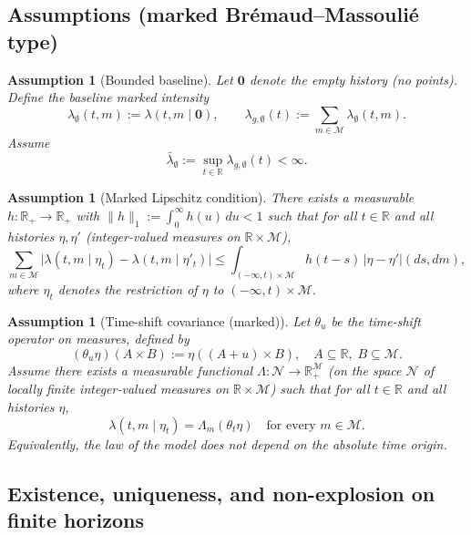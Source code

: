 \documentclass[12pt]{article}
\newtheorem{assumption}[theorem]{Assumption}
\begin{document}
\subsection{Assumptions (marked Br\'emaud--Massouli\'e type)}

\begin{assumption}[Bounded baseline]
\label{ass:H0_marked}
Let $\mathbf 0$ denote the empty history (no points).
Define the baseline marked intensity
\[
\lambda_\emptyset(t,m) := \lambda(t,m\mid \mathbf 0),
\qquad
\lambda_{g,\emptyset}(t) := \sum_{m\in\mathcal M}\lambda_\emptyset(t,m).
\]
Assume
\[
\bar\lambda_\emptyset := \sup_{t\in\mathbb R}\lambda_{g,\emptyset}(t) < \infty.
\]
\end{assumption}

\begin{assumption}[Marked Lipschitz condition]
\label{ass:HL_lambda_marked}
There exists a measurable $h:\mathbb R_+\to\mathbb R_+$ with $\|h\|_1:=\int_0^\infty h(u)\,du<1$ such that for all $t\in\mathbb R$ and all histories
$\eta,\eta'$ (integer-valued measures on $\mathbb R\times\mathcal M$),
\begin{equation}
\label{eq:HL_lambda_marked}
\sum_{m\in\mathcal M}\bigl|\lambda(t,m\mid \eta_t)-\lambda(t,m\mid \eta'_t)\bigr|
\le
\int_{(-\infty,t)\times\mathcal M} h(t-s)\,|\eta-\eta'|(ds,dm),
\end{equation}
where $\eta_t$ denotes the restriction of $\eta$ to $(-\infty,t)\times\mathcal M$.
\end{assumption}

\begin{assumption}[Time-shift covariance (marked)]
\label{ass:shift_covariance_marked}
Let $\theta_u$ be the time-shift operator on measures, defined by
\[
(\theta_u\eta)(A\times B) := \eta((A+u)\times B),
\quad A\subseteq\mathbb R,\; B\subseteq\mathcal M.
\]
Assume there exists a measurable functional $\Lambda:\mathcal N\to \mathbb R_+^{\mathcal M}$
(on the space $\mathcal N$ of locally finite integer-valued measures on $\mathbb R\times\mathcal M$)
such that for all $t\in\mathbb R$ and all histories $\eta$,
\[
\lambda(t,m\mid \eta_t)=\Lambda_m(\theta_t\eta)
\quad\text{for every }m\in\mathcal M.
\]
Equivalently, the law of the model does not depend on the absolute time origin.
\end{assumption}

\subsection{Existence, uniqueness, and non-explosion on finite horizons}
\end{document}
